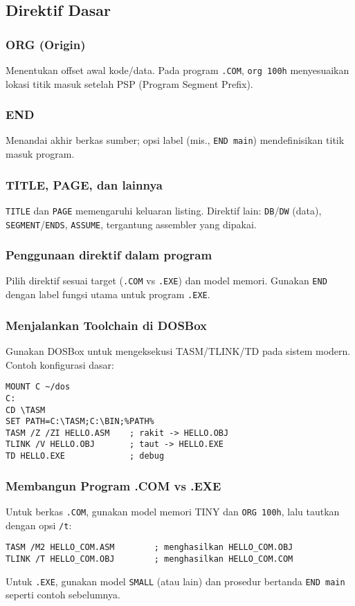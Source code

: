 \documentclass[../main.tex]{subfiles}
\begin{document}
\subsection{Direktif Dasar}
\subsubsection{ORG (Origin)}
Menentukan offset awal kode/data. Pada program \texttt{.COM}, \texttt{org 100h} menyesuaikan lokasi titik masuk setelah PSP (Program Segment Prefix).

\subsubsection{END}
Menandai akhir berkas sumber; opsi label (mis., \texttt{END main}) mendefinisikan titik masuk program.

\subsubsection{TITLE, PAGE, dan lainnya}
\texttt{TITLE} dan \texttt{PAGE} memengaruhi keluaran listing. Direktif lain: \texttt{DB}/\texttt{DW} (data), \texttt{SEGMENT}/\texttt{ENDS}, \texttt{ASSUME}, tergantung assembler yang dipakai.

\subsubsection{Penggunaan direktif dalam program}
Pilih direktif sesuai target (\texttt{.COM} vs \texttt{.EXE}) dan model memori. Gunakan \texttt{END} dengan label fungsi utama untuk program \texttt{.EXE}.

\subsubsection{Menjalankan Toolchain di DOSBox}
Gunakan DOSBox untuk mengeksekusi TASM/TLINK/TD pada sistem modern. Contoh konfigurasi dasar:
\begin{verbatim}
MOUNT C ~/dos
C:
CD \TASM
SET PATH=C:\TASM;C:\BIN;%PATH%
TASM /Z /ZI HELLO.ASM    ; rakit -> HELLO.OBJ
TLINK /V HELLO.OBJ       ; taut -> HELLO.EXE
TD HELLO.EXE             ; debug
\end{verbatim}

\subsubsection{Membangun Program .COM vs .EXE}
Untuk berkas \texttt{.COM}, gunakan model memori TINY dan \texttt{ORG 100h}, lalu tautkan dengan opsi \texttt{/t}:
\begin{verbatim}
TASM /M2 HELLO_COM.ASM        ; menghasilkan HELLO_COM.OBJ
TLINK /T HELLO_COM.OBJ        ; menghasilkan HELLO_COM.COM
\end{verbatim}
Untuk \texttt{.EXE}, gunakan model \texttt{SMALL} (atau lain) dan prosedur bertanda \texttt{END main} seperti contoh sebelumnya.
\end{document}
